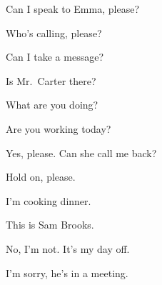 \begin{anglais}
\noindent\begin{minipage}[t]{0.48\linewidth}
\begin{questions}[1][english]
\item Can I speak to Emma, please? \hfill{}
\item Who's calling, please? \hfill{}
\item Can I take a message? \hfill{}
\item Is Mr.\ Carter there? \hfill{}
\item What are you doing? \hfill{}
\item Are you working today? \hfill{}
\end{questions}
\end{minipage}\hfill
\begin{minipage}[t]{0.46\linewidth}
\begin{questions}[1][english]
\item[a.] Yes, please. Can she call me back?
\item[b.] Hold on, please.
\item[c.] I'm cooking dinner.
\item[d.] This is Sam Brooks.
\item[e.] No, I'm not. It's my day off.
\item[f.] I'm sorry, he's in a meeting.
\end{questions}
\end{minipage}
\end{anglais}
\par{}

\begin{questions}[3]
\item {}\quad{}
\item {}\quad{}
\item {}\quad{}
\item {}\quad{}
\item {}\quad{}
\item {}\quad{}
\end{questions}

